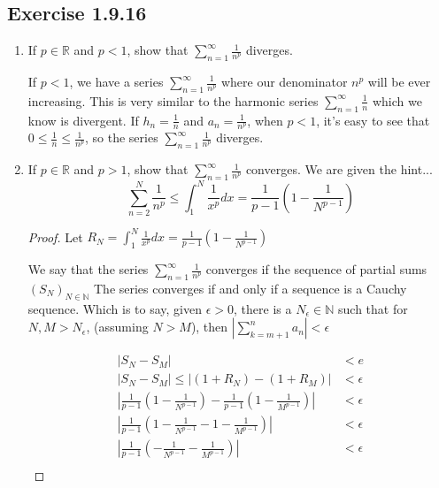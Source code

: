 \documentclass{tufte-book}
\theoremstyle{mytheoremstyle}
\theoremstyle{mylemstyle}
\theoremstyle{mydefstyle}
\begin{document}
\subsection{Exercise 1.9.16}

\begin{enumerate}

\item If $p \in \mathbb{R}$ and $p < 1$, show that $\sum_{n=1}^{\infty}\frac{1}{n^p}$ diverges.



If  $p < 1$, we have a series $\sum_{n=1}^{\infty}\frac{1}{n^p}$ where our denominator $n^p$ will be ever increasing.  This is very similar to the harmonic series $\sum_{n=1}^{\infty}\frac{1}{n}$ which we know is divergent.  If $h_n = \frac{1}{n}$ and $a_n = \frac{1}{n^p}$, when $p < 1$, it's easy to see that
$0 \leq \frac{1}{n} \leq \frac{1}{n^p}$, so the series $\sum_{n=1}^{\infty}\frac{1}{n^p}$ diverges.


\item If $p \in \mathbb{R}$ and $p > 1$, show that $\sum_{n=1}^{\infty}\frac{1}{n^p}$ converges.
We are given the hint...
\[ \sum_{n=2}^{N}\frac{1}{n^p} \leq \int_{1}^{N} \frac{1}{x^p}dx = \frac{1}{p-1}(1-\frac{1}{N^{p-1}})\]


\begin{proof}


Let $R_N = \int_{1}^{N} \frac{1}{x^p}dx = \frac{1}{p-1}(1-\frac{1}{N^{p-1}})$

We  say that the series $\sum_{n=1}^{\infty}\frac{1}{n^p}$ converges if the sequence of partial sums $(S_N)_{N \in \mathbb{N}}$  The series converges if and only if a sequence is a Cauchy sequence.  Which is to say, given $\epsilon > 0$, there is a $N_\epsilon\in \mathbb{N}$ such that for $N,M > N_\epsilon$, (assuming $N>M$), then $|\sum_{k=m+1}^{n}a_n| < \epsilon$

\begin{align*}
|S_N - S_M| &< e \\
|S_N - S_M| \leq |(1 + R_N) - (1 + R_M)| &< \epsilon \\
|\frac{1}{p-1}(1-\frac{1}{N^{p-1}}) - \frac{1}{p-1}(1-\frac{1}{M^{p-1}})| &< \epsilon \\
|\frac{1}{p-1}(1-\frac{1}{N^{p-1}} - 1-\frac{1}{M^{p-1}})| &< \epsilon\\
|\frac{1}{p-1}(-\frac{1}{N^{p-1}} - \frac{1}{M^{p-1}})| &< \epsilon\\
\end{align*}

\end{proof}
\end{enumerate}
\end{document}
